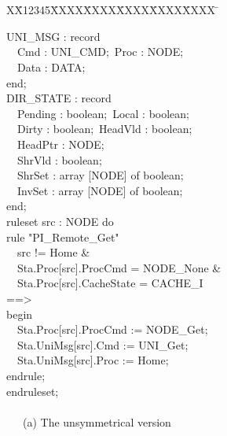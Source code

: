 \documentclass{llncs-new}
\newlength{\fminilength}
\newenvironment{fmini}[1][\linewidth]
  {\setlength{\fminilength}{#1\fboxsep-2\fboxrule}%
   \vspace{2ex}\noindent\begin{lrbox}{\fminibox}\begin{minipage}{\fminilength}%
   \mbox{ }\hfill\vspace{-2.5ex}}%
  {\end{minipage}\end{lrbox}\vspace{1ex}\hspace{0ex}%
   \framebox{\usebox{\fminibox}}}
\newenvironment{specification}
{\noindent\scriptsize
\tt\begin{fmini}\begin{tabbing}X\=X12345\=XXXX\=XXXX\=XXXX\=XXXX\=XXXX
\=\+\kill} {\end{tabbing}\normalfont\end{fmini}}
\def \twoSpaces {\ \ }
\newcommand{\forget}[1]{}
\def \twoSpaces {\ \ }
\begin{document}
{%
\begin{specification}
\begin{minipage}[t]{0.5\linewidth}
 UNI\_MSG : record\\
\indent \twoSpaces \quad  Cmd : UNI\_CMD;\     Proc : NODE;\\
\indent \twoSpaces     Data : DATA;\\
  end;\\
 DIR\_STATE : record\\
\indent \twoSpaces     Pending : boolean;\     Local : boolean;\\
\indent \twoSpaces     Dirty : boolean;\      HeadVld : boolean;\\
\indent \twoSpaces     HeadPtr : NODE;\\
\indent \twoSpaces     ShrVld : boolean;\\
\indent \twoSpaces     ShrSet : array [NODE] of boolean;\\
\indent \twoSpaces     InvSet : array [NODE] of boolean;\\
  end;  \\

  ruleset src : NODE do\\
rule "PI\_Remote\_Get"\\
\indent \twoSpaces  src != Home \&\\
\indent \twoSpaces  Sta.Proc[src].ProcCmd = NODE\_None \&\\
\indent \twoSpaces  Sta.Proc[src].CacheState = CACHE\_I\\
==>\\
begin\\
\indent \twoSpaces    Sta.Proc[src].ProcCmd := NODE\_Get;\\
\indent \twoSpaces    Sta.UniMsg[src].Cmd := UNI\_Get;\\
\indent \twoSpaces    Sta.UniMsg[src].Proc := Home;\\
endrule;\\
endruleset;\\
\twoSpaces \\
\indent  \ \twoSpaces (a) The unsymmetrical version\\
\end{minipage}

\begin{minipage}[t]{0.4\linewidth}


\end{minipage}
\end{specification}}
\end{document}
